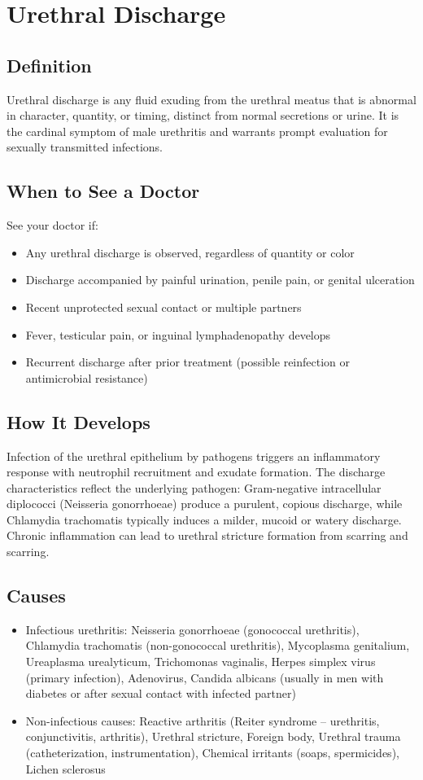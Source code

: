 \chapter{Urethral Discharge}

\section*{Definition}
Urethral discharge is any fluid exuding from the urethral meatus that is abnormal in character, quantity, or timing, distinct from normal secretions or urine. It is the cardinal symptom of male urethritis and warrants prompt evaluation for sexually transmitted infections.

\section*{When to See a Doctor}
See your doctor if:
\begin{itemize}
  \item Any urethral discharge is observed, regardless of quantity or color
  \item Discharge accompanied by painful urination, penile pain, or genital ulceration
  \item Recent unprotected sexual contact or multiple partners
  \item Fever, testicular pain, or inguinal lymphadenopathy develops
  \item Recurrent discharge after prior treatment (possible reinfection or antimicrobial resistance)
\end{itemize}

\section*{How It Develops}
Infection of the urethral epithelium by pathogens triggers an inflammatory response with neutrophil recruitment and exudate formation. The discharge characteristics reflect the underlying pathogen: Gram-negative intracellular diplococci (Neisseria gonorrhoeae) produce a purulent, copious discharge, while Chlamydia trachomatis typically induces a milder, mucoid or watery discharge. Chronic inflammation can lead to urethral stricture formation from scarring and scarring.

\section*{Causes}
\begin{itemize}
  \item Infectious urethritis: Neisseria gonorrhoeae (gonococcal urethritis), Chlamydia trachomatis (non-gonococcal urethritis), Mycoplasma genitalium, Ureaplasma urealyticum, Trichomonas vaginalis, Herpes simplex virus (primary infection), Adenovirus, Candida albicans (usually in men with diabetes or after sexual contact with infected partner)
  \item Non-infectious causes: Reactive arthritis (Reiter syndrome -- urethritis, conjunctivitis, arthritis), Urethral stricture, Foreign body, Urethral trauma (catheterization, instrumentation), Chemical irritants (soaps, spermicides), Lichen sclerosus
\end{itemize}

